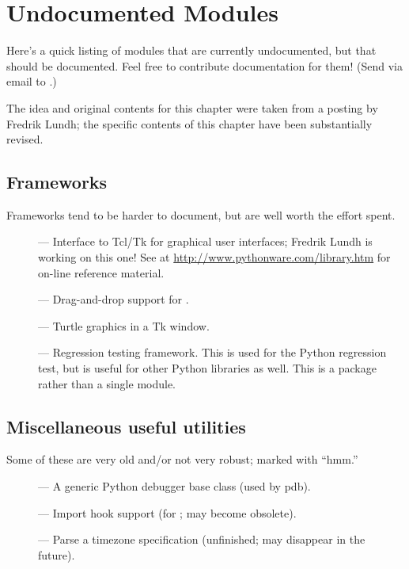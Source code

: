 \chapter{Undocumented Modules \label{undoc}}

Here's a quick listing of modules that are currently undocumented, but
that should be documented.  Feel free to contribute documentation for
them!  (Send via email to .)

The idea and original contents for this chapter were taken
from a posting by Fredrik Lundh; the specific contents of this chapter
have been substantially revised.


\section{Frameworks}

Frameworks tend to be harder to document, but are well worth the
effort spent.

\begin{description}
\item[]
--- Interface to Tcl/Tk for graphical user interfaces; Fredrik Lundh
is working on this one!  See
 at \url{http://www.pythonware.com/library.htm} for on-line
reference material.

\item[]
--- Drag-and-drop support for .

\item[]
--- Turtle graphics in a Tk window.

\item[]
--- Regression testing framework.  This is used for the Python
regression test, but is useful for other Python libraries as well.
This is a package rather than a single module.
\end{description}


\section{Miscellaneous useful utilities}

Some of these are very old and/or not very robust; marked with ``hmm.''

\begin{description}
\item[]
--- A generic Python debugger base class (used by pdb).

\item[]
--- Import hook support (for ; may become obsolete).

\item[]
--- Parse a timezone specification (unfinished; may disappear in the
future).
\end{description}


